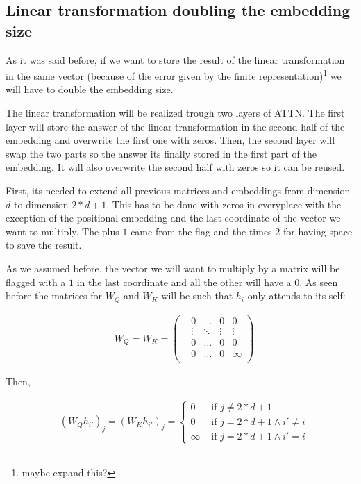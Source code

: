 \subsection*{Linear transformation doubling the embedding size}

As it was said before, if we want to store the result of the linear transformation in the same vector (because of the error given by the finite representation)\footnote{maybe expand this?} we will have to double the embedding size.

The linear transformation will be realized trough two layers of ATTN. The first layer will store the answer of the linear transformation in the second half of the embedding and overwrite the first one with zeros.
Then, the second layer will swap the two parts so the answer its finally stored in the first part of the embedding. It will also overwrite the second half with zeros so it can be reused.

First, its needed to extend all previous matrices and embeddings from dimension $d$ to dimension $2*d + 1$. This has to be done with zeros in everyplace with the exception of the positional embedding and the last coordinate of the vector we want to multiply. The plus $1$ came from the flag and the times $2$ for having space to save the result.


As we assumed before, the vector we will want to multiply by a matrix will be flagged with a $1$ in the last coordinate and all the other will have a $0$.
As seen before the matrices for $W_Q$ and $W_K$ will be such that $h_i$ only attends to its self:

\begin{align*}
    & W_Q = W_K = \left(\begin{matrix}
    &0      &\hdots &0      &0          \\
    &\vdots &\ddots &\vdots &\vdots     \\
    &0      &\hdots &0      &0          \\
    &0      &\hdots &0      &\infty    \\
\end{matrix}\right)
\end{align*}

Then,

\begin{align*}
    & (W_Q h_{i'})_j = (W_K h_{i'})_j = \begin{cases}
    0       &\text{ if } j \neq 2*d+1               \\
    0       &\text{ if } j = 2*d+1 \land i' \neq i  \\
    \infty  &\text{ if } j = 2*d+1 \land i' = i
\end{cases}
\end{align*}

